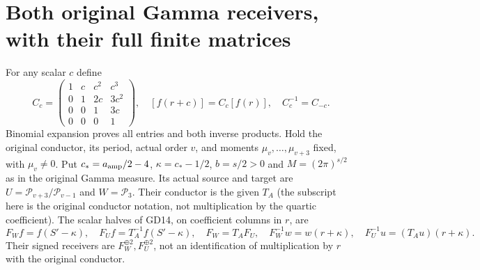 \documentclass[11pt]{article}
\begin{document}
\section{Both original Gamma receivers, with their full finite matrices}
For any scalar $c$ define
\begin{equation}
 C_c=\begin{pmatrix}1&c&c^2&c^3\\0&1&2c&3c^2\\
 0&0&1&3c\\0&0&0&1\end{pmatrix},\quad
 [f(r+c)]=C_c[f(r)],\quad C_c^{-1}=C_{-c}.
 \tag{ECC22}
\end{equation}
Binomial expansion proves all entries and both inverse products.
Hold the original conductor, its period, actual order $v$, and moments
$\mu_v,\ldots,\mu_{v+3}$ fixed, with $\mu_v\ne0$. Put
$c_*=a_{\rm amp}/2-4$, $\kappa=c_*-1/2$, $b=s/2>0$ and
$M=(2\pi)^{s/2}$ as in the original Gamma measure. Its actual source and
target are $U=\mathcal P_{v+3}/\mathcal P_{v-1}$ and $W=\mathcal P_3$.
Their conductor is the given $T_A$ (the subscript here is the original
conductor notation, not multiplication by the quartic coefficient).
The scalar halves of GD14, on coefficient columns in $r$, are
\begin{equation}
 F_W f=f(S'-\kappa),\quad F_U f=T_A^{-1}f(S'-\kappa),\quad
 F_W=T_AF_U,\quad F_W^{-1}w=w(r+\kappa),\quad
 F_U^{-1}u=(T_Au)(r+\kappa).
 \tag{ECC23}
\end{equation}
Their signed receivers are $F_W^{\oplus2},F_U^{\oplus2}$, not an
identification of multiplication by $r$ with the original conductor.
\end{document}
